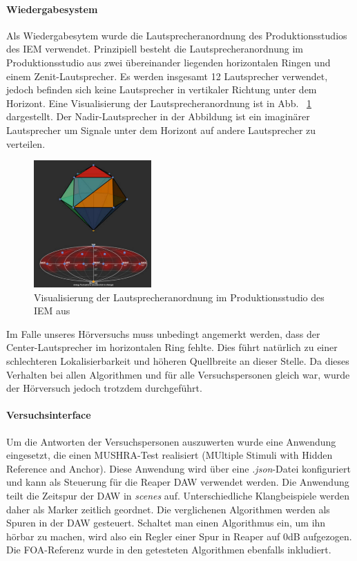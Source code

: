 \paragraph{Wiedergabesystem}
Als Wiedergabesytem wurde die Lautsprecheranordnung des Produktionsstudios des IEM verwendet. Prinzipiell besteht die Lautsprecheranordnung im Produktionsstudio aus zwei übereinander liegenden horizontalen Ringen und einem Zenit-Lautsprecher. Es werden insgesamt 12 Lautsprecher verwendet, jedoch befinden sich keine Lautsprecher in vertikaler Richtung unter dem Horizont. Eine Visualisierung der Lautsprecheranordnung ist in Abb. ~\ref{fig:aufb:prodstud} dargestellt. Der Nadir-Lautsprecher in der Abbildung ist ein imaginärer Lautsprecher um Signale unter dem Horizont auf andere Lautsprecher zu verteilen.

\begin{figure}[!ht]
  \centering
  \includegraphics[width=0.4\textwidth]{aufbau/plots/speaker_pos_prod_studio.png}
  \caption{Visualisierung der Lautsprecheranordnung im Produktionsstudio des IEM aus \cite{ambi-book}}
  \label{fig:aufb:prodstud}
\end{figure}



Im Falle unseres Hörversuchs muss unbedingt angemerkt werden, dass der Center-Lautsprecher im horizontalen Ring fehlte. Dies führt natürlich zu einer schlechteren Lokalisierbarkeit und höheren Quellbreite an dieser Stelle. Da dieses Verhalten bei allen Algorithmen und für alle Versuchspersonen gleich war, wurde der Hörversuch jedoch trotzdem durchgeführt.

\paragraph{Versuchsinterface}
Um die Antworten der Versuchspersonen auszuwerten wurde eine Anwendung eingesetzt, die einen MUSHRA-Test realisiert (MUltiple Stimuli with Hidden Reference and Anchor). Diese Anwendung wird über eine \textit{.json}-Datei konfiguriert und kann als Steuerung für die Reaper DAW verwendet werden. Die Anwendung teilt die Zeitspur der DAW in \textit{scenes} auf. Unterschiedliche Klangbeispiele werden daher als Marker zeitlich geordnet. Die verglichenen Algorithmen werden als Spuren in der DAW gesteuert. Schaltet man einen Algorithmus ein, um ihn hörbar zu machen, wird also ein Regler einer Spur in Reaper auf 0dB aufgezogen. Die FOA-Referenz wurde in den getesteten Algorithmen ebenfalls inkludiert.

